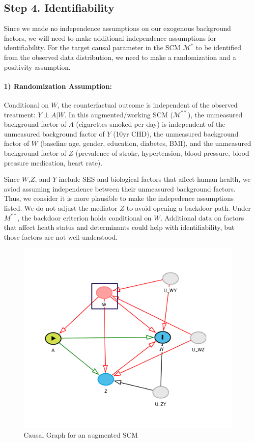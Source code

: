 \documentclass[]{article}
\let\oldparagraph\paragraph
\renewcommand{\paragraph}[1]{\oldparagraph{#1}\mbox{}}
\begin{document}
\hypertarget{step-4.-identifiability}{%
\subsection{Step 4. Identifiability}\label{step-4.-identifiability}}

Since we made no independence assumptions on our exogenous background
factors, we will need to make additional independence assumptions for
identifiability. For the target causal parameter in the SCM
\(\mathcal{M^*}\) to be identified from the observed data distribution,
we need to make a randomization and a positivity assumption.

\hypertarget{randomization-assumption}{%
\paragraph{1) Randomization
Assumption:}\label{randomization-assumption}}

Conditional on \(W\), the counterfactual outcome is independent of the
observed treatment: \(Y \perp A|W\). In this augmented/working SCM
(\(\mathcal{M^{**}}\)), the unmeasured background factor of \(A\)
(cigarettes smoked per day) is independent of the unmeasured background
factor of \(Y\) (10yr CHD), the unmeasured background factor of \(W\)
(baseline age, gender, education, diabetes, BMI), and the unmeasured
background factor of \(Z\) (prevalence of stroke, hypertension, blood
pressure, blood pressure medication, heart rate).

Since \(W\),\(Z\), and \(Y\) include SES and biological factors that
affect human health, we aviod assuming independence between their
unmeasured background factors. Thus, we consider it is more plausible to
make the indepedence assumptions listed. We do not adjust the mediator
\(Z\) to avoid opening a backdoor path. Under \(M^{**}\), the backdoor
criterion holds conditional on \(W\). Additional data on factors that
affect heath status and determinants could help with identifiability,
but those factors are not well-understood.

\begin{figure}[h]

{\centering \includegraphics[width=0.7\linewidth]{./dags/augmented_dag} 

}

\caption{Causal Graph for an augmented SCM}\label{fig:figc}
\end{figure}
\end{document}
